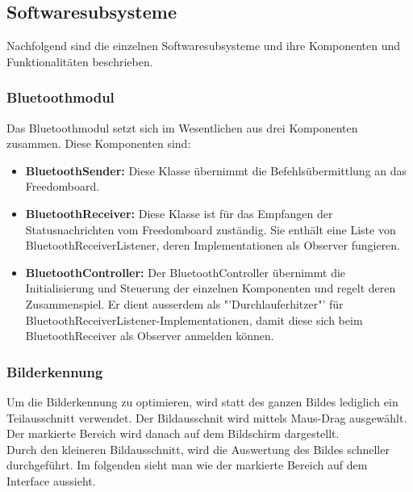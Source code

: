 \subsection{Softwaresubsysteme}
Nachfolgend sind die einzelnen Softwaresubsysteme und ihre Komponenten und Funktionalitäten beschrieben.
\subsubsection{Bluetoothmodul}
Das Bluetoothmodul setzt sich im Wesentlichen aus drei Komponenten zusammen. Diese Komponenten sind:
\begin{itemize}
	\item{\textbf{BluetoothSender:} Diese Klasse übernimmt die Befehlsübermittlung an das Freedomboard.}
	\item{\textbf{BluetoothReceiver:} Diese Klasse ist für das Empfangen der Statusnachrichten vom Freedomboard zuständig. Sie enthält eine Liste von BluetoothReceiverListener, deren Implementationen als Observer fungieren.}
	\item{\textbf{BluetoothController:} Der BluetoothController übernimmt die Initialisierung und Steuerung der einzelnen Komponenten und regelt deren Zusammenspiel. Er dient ausserdem als "'Durchlauferhitzer"' für BluetoothReceiverListener-Implementationen, damit diese sich beim BluetoothReceiver als Observer anmelden können.}
\end{itemize}

\subsubsection{Bilderkennung}
Um die Bilderkennung zu optimieren, wird statt des ganzen Bildes lediglich ein 
Teilausschnitt verwendet.  Der Bildausschnit wird mittels Maus-Drag 
ausgewählt. Der markierte Bereich wird danach auf dem Bildschirm dargestellt. \\

\noindent
Durch den kleineren Bildausschnitt, wird die Auswertung des Bildes schneller 
durchgeführt. Im folgenden sieht man wie der markierte Bereich auf dem 
Interface aussieht.\\

